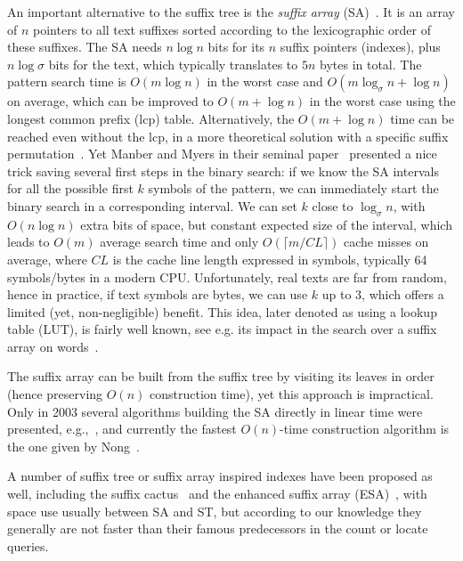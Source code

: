 \documentclass{cai}
\begin{document}
An important alternative to the suffix tree is the {\em suffix array} (SA)~\cite{MM90}.
It is an array of $n$ pointers to all text suffixes 
sorted according to the lexicographic order of these suffixes.
The SA needs $n\log n$ bits for its $n$ suffix pointers (indexes), 
plus $n\log\sigma$ bits for the text, which typically translates to $5n$ 
bytes in total.
The pattern search time is $O(m\log n)$ in the worst case 
and $O(m\log_{\sigma}n + \log n)$ on average,
which can be
improved to $O(m + \log n)$ in the worst case 
using the longest common prefix (lcp) table.
Alternatively, the $O(m + \log n)$ time can be reached even without the lcp,
in a more theoretical solution with a specific suffix permutation~\cite{DBLP:journals/talg/FranceschiniG08}.
Yet Manber and Myers in their seminal paper~\cite{MM90} presented a nice 
trick saving several first steps in the binary search:
if we know the SA intervals for all the possible first $k$ symbols of the
pattern, we can immediately start the binary search in a corresponding interval.
We can set $k$ close to $\log_{\sigma} n$, with $O(n\log n)$ extra bits of
space, but constant expected size of the interval, which leads to $O(m)$ average
search time and only 
$O(\lceil m/CL \rceil)$ 
cache misses on average, 
where 
$CL$
is the cache line length expressed in symbols,  
typically 64 symbols/bytes in a modern CPU.
Unfortunately, real texts are far from random, hence in practice, 
if text symbols are bytes, 
we can use $k$ up to 3, which offers a limited (yet, non-negligible)
benefit.
This idea, later denoted as using a lookup table (LUT), is fairly well known, 
see e.g. its impact in the search over a suffix array on words~\cite{DBLP:conf/cpm/FerraginaF07}.

The suffix array can be built from the suffix tree by visiting its leaves 
in order (hence preserving $O(n)$ construction time), yet this approach is 
impractical.
Only in 2003 several algorithms building the SA directly in linear time 
were presented, e.g.,~\cite{KS03}, and currently the fastest $O(n)$-time 
construction algorithm is the one given by Nong~\cite{NZC11}.

A number of suffix tree or suffix array inspired indexes have been proposed 
as well, including the suffix cactus~\cite{karkkainen1995suffix} and the 
enhanced suffix array (ESA)~\cite{abouelhoda2002enhanced}, with space use usually 
between SA and ST, 
but according to our knowledge they generally are not faster than their 
famous predecessors in the count or locate queries.
\end{document}
